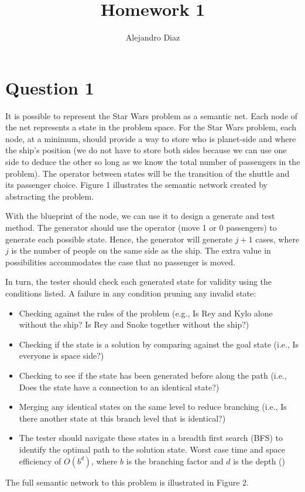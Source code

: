\documentclass[
	letterpaper, %
]{jdf}
\author{Alejandro Diaz}
\title{Homework 1}
\begin{document}

\maketitle

\section{Question 1}
It is possible to represent the Star Wars problem as a semantic net. Each node of the net represents a state in the problem space. For the Star Wars problem, each node, at a minimum, should provide a way to store who is planet-side and where the ship's position (we do not have to store both sides because we can use one side to deduce the other so long as we know the total number of passengers in the problem). The operator between states will be the transition of the shuttle and its passenger choice. Figure 1 illustrates the semantic network created by abstracting the problem.  

With the blueprint of the node, we can use it to design a generate and test method. The generator should use the operator (move 1 or 0 passengers) to generate each possible state. Hence, the generator will generate $j + 1$ cases, where $j$ is the number of people on the same side as the ship. The extra value in possibilities accommodates the case that no passenger is moved.  

In turn, the tester should check each generated state for validity using the conditions listed. A failure in any condition pruning any invalid state: 

\begin{itemize}
	\item Checking against the rules of the problem (e.g., Is Rey and Kylo alone without the ship? Is Rey and Snoke together without the ship?) 
	\item Checking if the state is a solution by comparing against the goal state (i.e., Is everyone is space side?) 
	\item Checking to see if the state has been generated before along the path (i.e., Does the state have a connection to an identical state?) 
	\item Merging any identical states on the same level to reduce branching (i.e., Is there another state at this branch level that is identical?) 
	\item The tester should navigate these states in a breadth first search (BFS) to identify the optimal path to the solution state. Worst case time and space efficiency of $O(b^d)$, where $b$ is the branching factor and $d$ is the depth (\cite{korf_artificial_1999})
\end{itemize}
The full semantic network to this problem is illustrated in Figure 2.
\end{document}
